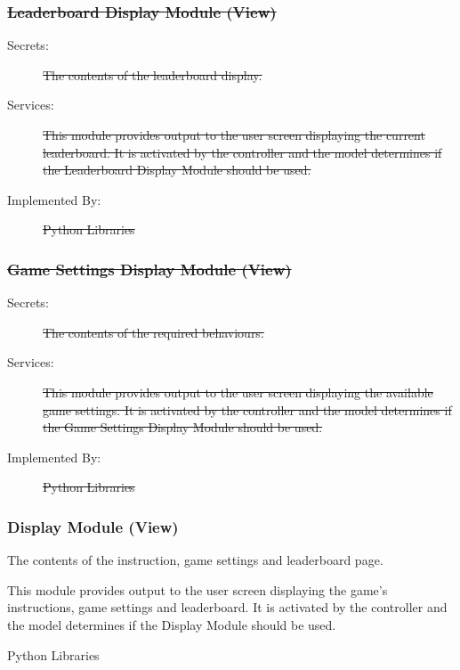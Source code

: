 \documentclass[12pt, titlepage]{article}
\begin{document}
\subsubsection{\sout{Leaderboard Display Module (View)}}
\begin{description}
\item[Secrets:]\sout{The contents of the leaderboard display.}
\item[Services:] \sout{This module provides output to the user screen displaying the current leaderboard. It is activated by the controller and the model determines if the Leaderboard Display Module should be used.}
\item[Implemented By:]\sout{ Python Libraries}
\end{description}

\subsubsection{\sout{Game Settings Display Module (View)}}
\begin{description}
\item[Secrets:]\sout{The contents of the required behaviours.}
\item[Services:] \sout{This module provides output to the user screen displaying the available game settings. It is activated by the controller and the model determines if the Game Settings Display Module should be used. }
\item[Implemented By:]\sout{ Python Libraries}
\end{description}

\subsubsection{ Display Module (View)}
\begin{description}
\color{blue}
\item[Secrets:]The contents of the instruction, game settings and leaderboard page. 
\item[Services:] This module provides output to the user screen displaying the game's instructions, game settings and leaderboard. It is activated by the controller and the model determines if the Display Module should be used. 
\item[Implemented By:] Python Libraries
\end{description}
\end{document}
